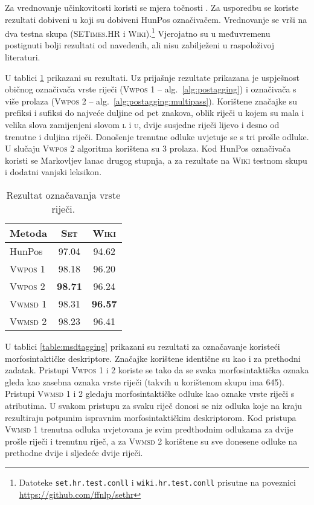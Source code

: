 Za vrednovanje učinkovitosti koristi se mjera točnosti . Za
usporedbu se koriste rezultati dobiveni u \citep{agic2013lemmatization} koji su
dobiveni HunPos označivačem. Vrednovanje se vrši na dva testna skupa
(\textsc{SETimes.HR} i \textsc{Wiki}).\footnote{Datoteke
\texttt{set.hr.test.conll} i \texttt{wiki.hr.test.conll} prisutne na poveznici
\url{https://github.com/ffnlp/sethr}} Vjerojatno su u međuvremenu postignuti
bolji rezultati od navedenih, ali nisu zabilježeni u raspoloživoj literaturi.

U tablici \ref{table:postagging} prikazani su rezultati. Uz prijašnje rezultate
prikazana je uspješnost običnog označivača vrste riječi (\textsc{Vwpos 1} --
alg.~\ref{alg:postagging}) i označivača s više prolaza (\textsc{Vwpos 2} --
alg.~\ref{alg:postagging:multipass}). Korištene značajke su prefiksi i sufiksi
do najveće duljine od pet znakova, oblik riječi u kojem su mala i velika slova
zamijenjeni slovom \textsc{l} i \textsc{u}, dvije susjedne riječi lijevo i desno
od trenutne i duljina riječi. Donošenje trenutne odluke uvjetuje se s tri prošle
odluke. U slučaju \textsc{Vwpos 2} algoritma korištena su 3 prolaza. Kod HunPos
označivača koristi se Markovljev lanac drugog stupnja, a za rezultate na
\textsc{Wiki} testnom skupu i dodatni vanjski leksikon.

\begin{table}
\centering
\caption[Rezultat označavanja vrste riječi.]{Rezultat označavanja vrste riječi.}
\label{table:postagging}
\begin{tabular}{|l|c|c|}
\hline
Metoda             & \textsc{Set}   & \textsc{Wiki}  \\ \hline \hline
HunPos             & 97.04          & 94.62          \\
\textsc{Vwpos 1}   & 98.18          & 96.20          \\
\textsc{Vwpos 2}   & \textbf{98.71} & 96.24          \\
\textsc{Vwmsd} 1   & 98.31          & \textbf{96.57} \\
\textsc{Vwmsd} 2   & 98.23          & 96.41          \\ \hline
\end{tabular}
\end{table}

U tablici \ref{table:msdtagging} prikazani su rezultati za označavanje koristeći
morfosintaktičke deskriptore. Značajke korištene identične su kao i za prethodni
zadatak. Pristupi \textsc{Vwpos 1} i \textsc{2} koriste se tako da se svaka
morfosintaktička oznaka gleda kao zasebna oznaka vrste riječi (takvih u
korištenom skupu ima 645). Pristupi \textsc{Vwmsd} 1 i 2 gledaju
morfosintaktičke odluke kao oznake vrste riječi s atributima. U svakom pristupu
za svaku riječ donosi se niz odluka koje na kraju rezultiraju potpunim ispravnim
morfosintaktičkim deskriptorom.  Kod pristupa \textsc{Vwmsd 1} trenutna odluka
uvjetovana je svim predthodnim odlukama za dvije prošle riječi i trenutnu riječ,
a za \textsc{Vwmsd 2} korištene su sve donesene odluke na prethodne dvije i
sljedeće dvije riječi.

